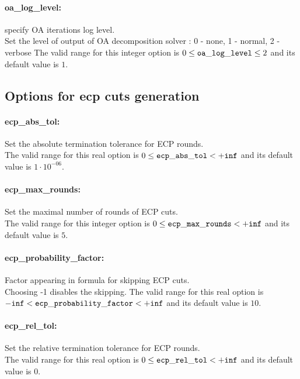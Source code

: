 \paragraph{oa\_log\_level:}\label{sec:oa_log_level} specify OA iterations log level. $\;$ \\
 Set the level of output of OA decomposition
solver : 0 - none, 1 - normal, 2 - verbose The valid range for this integer option is
$0 \le {\tt oa\_log\_level } \le 2$
and its default value is $1$.


\subsection{Options for ecp cuts generation}
\label{sec:Options_for_ecp_cuts_generation}
\paragraph{ecp\_abs\_tol:}\label{sec:ecp_abs_tol} Set the absolute termination tolerance for ECP rounds. $\;$ \\
 The valid range for this real option is 
$0 \le {\tt ecp\_abs\_tol } <  {\tt +inf}$
and its default value is $1 \cdot 10^{-06}$.


\paragraph{ecp\_max\_rounds:}\label{sec:ecp_max_rounds} Set the maximal number of rounds of ECP cuts. $\;$ \\
 The valid range for this integer option is
$0 \le {\tt ecp\_max\_rounds } <  {\tt +inf}$
and its default value is $5$.


\paragraph{ecp\_probability\_factor:}\label{sec:ecp_probability_factor} Factor appearing in formula for skipping ECP cuts. $\;$ \\
 Choosing -1 disables the skipping. The valid range for this real option is 
${\tt -inf} <  {\tt ecp\_probability\_factor } <  {\tt +inf}$
and its default value is $10$.


\paragraph{ecp\_rel\_tol:}\label{sec:ecp_rel_tol} Set the relative termination tolerance for ECP rounds. $\;$ \\
 The valid range for this real option is 
$0 \le {\tt ecp\_rel\_tol } <  {\tt +inf}$
and its default value is $0$.


